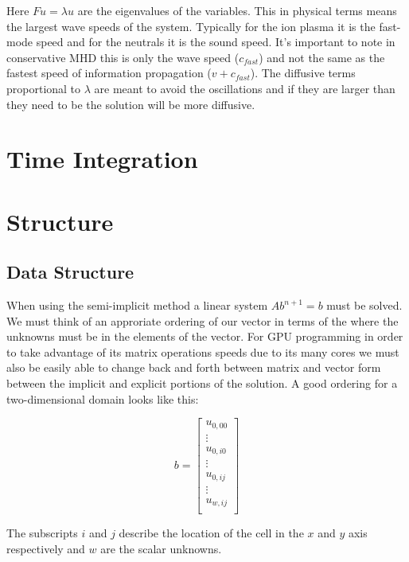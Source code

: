 \documentclass[12pt,upcase]{umlthesis}
\begin{document}
Here $F u = \lambda u$ are the eigenvalues of the variables. This in physical terms means the largest wave speeds of the system. Typically for the ion plasma it is the fast-mode speed and for the neutrals it is the sound speed. It's important to note in conservative MHD this is only the wave speed ($c_{fast}$) and not the same as the fastest speed of information propagation ($v+c_{fast}$). The diffusive terms proportional to $\lambda$ are meant to avoid the oscillations and if they are larger than they need to be the solution will be more diffusive.

\section{Time Integration}

\section{Structure}

\subsection{Data Structure}

When using the semi-implicit method a linear system $Ab^{n+1}=b$ must be solved. We must think of an approriate ordering of our vector in terms of the where the unknowns must be in the elements of the vector. For GPU programming in order to take advantage of its matrix operations speeds due to its many cores we must also be easily able to change back and forth between matrix and vector form between the implicit and explicit portions of the solution. A good ordering for a two-dimensional domain looks like this:

\begin{equation}
	b =
\begin{bmatrix}
	u_{0,00} \\
	\vdots \\
	u_{0,i0} \\
	\vdots \\
	u_{0,ij} \\
	\vdots \\
	u_{w,ij} \\
\end{bmatrix}
\end{equation}

The subscripts $i$ and $j$ describe the location of the cell in the $x$ and $y$ axis respectively and $w$ are the scalar unknowns.
\end{document}

